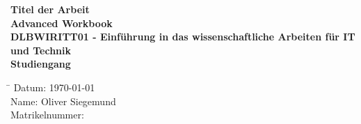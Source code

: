 \documentclass[11pt]{article}
\begin{document}
\begin{titlepage}
    \begin{center}
        \vspace*{2cm}

        {\LARGE \textbf{Titel der Arbeit}}\\[1.5cm] %
        
        {\large \textbf{Advanced Workbook}}\\[1.5cm] %

        \textbf{DLBWIRITT01 - Einführung in das wissenschaftliche Arbeiten für IT und Technik}\\[0.5cm] %

        \textbf{Studiengang}\\[1.5cm] %

        \begin{tabbing}
            \hspace*{4cm}\=\kill
            Datum: \> \today \\[0.5cm] %
            Name: \> Oliver Siegemund\\[0.5cm] %
            Matrikelnummer:  \\[0.5cm] %
        \end{tabbing}

        \vfill

    \end{center}
\end{titlepage}
\tableofcontents
\newpage
{}
\end{document}
